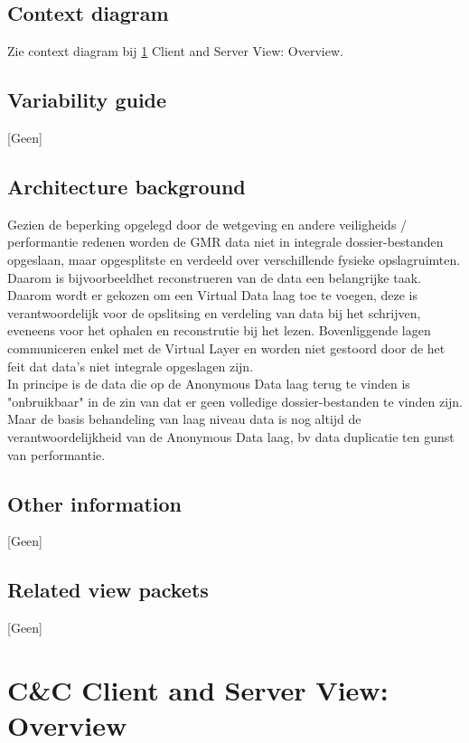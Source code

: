 \documentclass[a4paper,10pt]{article}
\begin{document}
\subsection{Context diagram}
Zie context diagram bij \ref{Client and Server View: Overview} Client and Server View: Overview.

\subsection{Variability guide}
[Geen]

\subsection{Architecture background}
Gezien de beperking opgelegd door de wetgeving en andere veiligheids / performantie redenen worden de GMR data niet in integrale dossier-bestanden opgeslaan, maar opgesplitste en verdeeld over verschillende fysieke opslagruimten. Daarom is bijvoorbeeldhet reconstrueren van de data een belangrijke taak.\\
Daarom wordt er gekozen om een Virtual Data laag toe te voegen, deze is verantwoordelijk voor de opslitsing en verdeling van data bij het schrijven, eveneens voor het ophalen en reconstrutie bij het lezen. Bovenliggende lagen communiceren enkel met de Virtual Layer en worden niet gestoord door de het feit dat data's niet integrale opgeslagen zijn.\\


In principe is de data die op de Anonymous Data laag terug te vinden is "onbruikbaar" in de zin van dat er geen volledige dossier-bestanden te vinden zijn. Maar de basis behandeling van laag niveau data is nog altijd de verantwoordelijkheid van de Anonymous Data laag, bv data duplicatie ten gunst van performantie.\\
\subsection{Other information}
[Geen]

\subsection{Related view packets}
[Geen]

\clearpage
\section{C\&C Client and Server View: Overview}
\label{Client and Server View: Overview}
\end{document}
